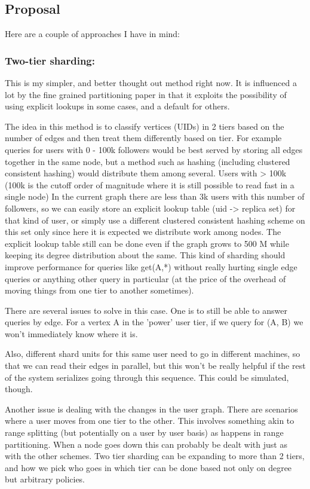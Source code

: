 \documentclass{article}
\begin{document}
\subsection{Proposal}

Here are a couple of approaches  I have in mind:

\subsubsection{Two-tier sharding:}

This is my simpler, and better thought out method right now. It is influenced a lot by the fine grained partitioning paper in that it exploits the possibility of using explicit lookups in some cases, and a default for others.

The idea in this method is to classify vertices (UIDs) in 2 tiers based on the number of edges and then treat them differently based on tier. For example  queries for users with 0 - 100k  followers would be best served by storing all edges together in the same node, but a method such as hashing (including clustered consistent hashing) would distribute them among several.  Users with > 100k (100k is the cutoff order of magnitude where it is still possible to read fast in a single node) In the current graph there are less than 3k users with this number of followers,  so we can easily store an explicit lookup table (uid -> replica set) for that kind of user, or simply use a different clustered consistent hashing scheme on this set only since here it is expected we distribute work among nodes.  The explicit lookup table still can be done even if the graph grows to 500 M while keeping its degree distribution about the same.  This kind of sharding should improve performance for queries like get(A,*) without really hurting single edge queries or anything other query in particular (at the price of  the overhead of moving things from one tier to another sometimes).

There are several issues to solve in this case. One is to still be able to answer queries by edge. For a vertex A in the 'power' user tier, if we query for (A, B) we won't immediately know where it is.   

Also, different shard units for this same user need to go in different machines, so that we can read their edges in parallel, but this won't be really helpful if the rest of the system serializes going through this sequence. This could be simulated, though.

 Another issue is dealing with the changes in the user graph. There are scenarios where a user moves from one tier to the other. This involves something akin to range splitting (but potentially on a user by user basis) as happens in range partitioning.   When a node goes down this can probably be dealt with just as with the other schemes.  Two tier sharding can be expanding to more than 2 tiers, and how we pick who goes in which tier can be done based not only on degree but arbitrary policies.  
\end{document}

